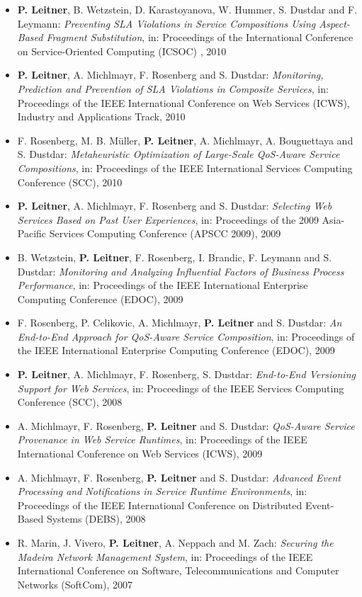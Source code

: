 \documentclass[paper=letter,fontsize=11pt]{scrartcl} %
\begin{document}
\begin{itemize}
\item \textbf{P. Leitner}, B. Wetzstein, D. Karastoyanova, W. Hummer, S. Dustdar and F. Leymann: \emph{Preventing SLA Violations in Service Compositions Using Aspect-Based Fragment Substitution}, in: Proceedings of the International Conference on Service-Oriented Computing (ICSOC) , 2010
\item \textbf{P. Leitner}, A. Michlmayr, F. Rosenberg and S. Dustdar: \emph{Monitoring, Prediction and Prevention of SLA Violations in Composite Services}, in: Proceedings of the IEEE International Conference on Web Services (ICWS), Industry and Applications Track, 2010
\item F. Rosenberg, M. B. M\"uller, \textbf{P. Leitner}, A. Michlmayr, A. Bouguettaya
and S. Dustdar: \emph{Metaheuristic Optimization of Large-Scale QoS-Aware Service Compositions}, in: Proceedings of the IEEE International Services Computing Conference (SCC), 2010
\item \textbf{P. Leitner}, A. Michlmayr, F. Rosenberg and S. Dustdar: \emph{Selecting Web Services Based on Past User Experiences}, in: Proceedings of the 2009 Asia-Pacific Services Computing Conference (APSCC 2009), 2009
\item B. Wetzstein, \textbf{P. Leitner}, F. Rosenberg, I. Brandic, F. Leymann and S. Dustdar: \emph{Monitoring and Analyzing Influential Factors of Business Process Performance}, in: Proceedings of the IEEE International Enterprise Computing Conference (EDOC), 2009
\item F. Rosenberg, P. Celikovic, A. Michlmayr, \textbf{P. Leitner} and S. Dustdar: \emph{An End-to-End Approach for QoS-Aware Service Composition}, in: Proceedings of the IEEE International Enterprise Computing Conference (EDOC), 2009
\item \textbf{P. Leitner}, A. Michlmayr, F. Rosenberg, S. Dustdar: \emph{End-to-End Versioning Support for Web Services}, in: Proceedings of the IEEE Services Computing Conference (SCC), 2008
\item A. Michlmayr, F. Rosenberg, \textbf{P. Leitner} and S. Dustdar: \emph{QoS-Aware Service Provenance in Web Service Runtimes}, in: Proceedings of the IEEE International Conference on Web Services (ICWS), 2009
\item A. Michlmayr, F. Rosenberg, \textbf{P. Leitner} and S. Dustdar: \emph{Advanced Event Processing and Notifications in Service Runtime Environments}, in: Proceedings of the IEEE International Conference on Distributed Event-Based Systems (DEBS), 2008
\item R. Marin, J. Vivero, \textbf{P. Leitner}, A. Neppach and M. Zach: \emph{Securing the Madeira Network Management System}, in: Proceedings of the IEEE International Conference on Software, Telecommunications and Computer Networks (SoftCom), 2007

\end{itemize}
\end{document}
